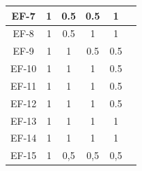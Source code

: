 \documentclass[conference,onecolumn,10pt]{IEEEtran}
\begin{document}
\begin{table}[]
\begin{tabular}{|c|c|c|c|c|l|l|}
                \rowcolor[HTML]{FFFFFF} 
                EF-7                          & 1                        & 0.5                      & 0.5                      & 1                        & \multicolumn{2}{l|}{\cellcolor[HTML]{FFFFFF}} \\ \hline
                \rowcolor[HTML]{FFFFFF} 
                EF-8                          & 1                        & 0.5                      & 1                        & 1                        & \multicolumn{2}{l|}{\cellcolor[HTML]{FFFFFF}} \\ \hline
                \rowcolor[HTML]{FFFFFF} 
                EF-9                          & 1                        & 1                        & 0.5                      & 0.5                      & \multicolumn{2}{l|}{\cellcolor[HTML]{FFFFFF}} \\ \hline
                \rowcolor[HTML]{FFFFFF} 
                EF-10                         & 1                        & 1                        & 1                        & 0.5                      & \multicolumn{2}{l|}{\cellcolor[HTML]{FFFFFF}} \\ \hline
                \rowcolor[HTML]{FFFFFF} 
                EF-11                         & 1                        & 1                        & 1                        & 0.5                      & \multicolumn{2}{l|}{\cellcolor[HTML]{FFFFFF}} \\ \hline
                \rowcolor[HTML]{FFFFFF} 
                EF-12                         & 1                        & 1                        & 1                        & 0.5                      & \multicolumn{2}{l|}{\cellcolor[HTML]{FFFFFF}} \\ \hline
                \rowcolor[HTML]{FFFFFF} 
                EF-13                         & 1                        & 1                        & 1                        & 1                        & \multicolumn{2}{l|}{\cellcolor[HTML]{FFFFFF}} \\ \hline
                \rowcolor[HTML]{FFFFFF} 
                EF-14                         & 1                        & 1                        & 1                        & 1                        & \multicolumn{2}{l|}{\cellcolor[HTML]{FFFFFF}} \\ \hline
                \rowcolor[HTML]{FFFFFF} 
                EF-15                         & 1                        & 0,5                      & 0,5                      & 0,5                      & \multicolumn{2}{l|}{\cellcolor[HTML]{FFFFFF}} \\ \hline

\end{tabular}
\end{table}
\end{document}
